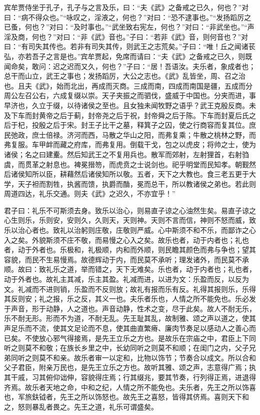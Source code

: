 \documentclass[]{article}
\begin{document}
宾牟贾侍坐于孔子，孔子与之言及乐，曰：``夫《武》之备戒之已久，何也？''对曰：``病不得众也。''``咏叹之，淫液之，何也？''对曰：``恐不逮事也。''``发扬蹈厉之已蚤，何也？''对曰：``及时事也。''``武坐致右宪左，何也？''对曰：``非武坐也。''``声淫及商，何也？''对曰：``非《武》音也。''子曰：``若非《武》音，则何音也？''对曰：``有司失其传也。若非有司失其传，则武王之志荒矣。''子曰：``唯！丘之闻诸苌弘，亦若吾子之言是也。''宾牟贾起，免席而请曰：``夫《武》之备戒之已久，则既闻命矣，敢问：迟之迟而又久，何也？''子曰：``居！吾语汝。夫乐者，象成者也；总干而山立，武王之事也；发扬蹈厉，大公之志也。《武》乱皆坐，周、召之治也。且夫《武》，始而北出，再成而灭商。三成而南，四成而南国是疆，五成而分周公左召公右，六成复缀以崇。天子夹振之而驷伐，盛威于中国也。分夹而进，事早济也，久立于缀，以待诸侯之至也。且女独未闻牧野之语乎？武王克殷反商。未及下车而封黄帝之后于蓟，封帝尧之后于祝，封帝舜之后于陈。下车而封夏后氏之后于杞，投殷之后于宋。封王子比干之墓，释箕子之囚，使之行商容而复其位。庶民弛政，庶士倍禄。济河而西，马散之华山之阳，而弗复乘；牛散之桃林之野，而弗复服。车甲衅而藏之府库，而弗复用。倒载干戈，包之以虎皮；将帅之士，使为诸侯；名之曰建櫜。然后知武王之不复用兵也。散军而郊射，左射狸首，右射驺虞，而贯革之射息也。裨冕搢笏，而虎贲之士说剑也。祀乎明堂而民知孝。朝觐然后诸侯知所以臣，耕藉然后诸侯知所以敬。五者，天下之大教也。食三老五更于大学，天子袒而割牲，执酱而馈，执爵而酳，冕而总干，所以教诸侯之弟也。若此则周道四达，礼乐交通。则夫《武》之迟久，不亦宜乎！''

君子曰：礼乐不可斯须去身。致乐以治心，则易直子谅之心油然生矣。易直子谅之心生则乐，乐则安，安则久，久则天，天则神。天则不言而信，神则不怒而威，致乐以治心者也。致礼以治躬则庄敬，庄敬则严威。心中斯须不和不乐，而鄙诈之心入之矣。外貌斯须不庄不敬，而易慢之心入之矣。故乐也者，动于内者也；礼也者，动于外者也。乐极和，礼极顺，内和而外顺，则民瞻其颜色而弗与争也；望其容貌，而民不生易慢焉。故德辉动于内，而民莫不承听；理发诸外，而民莫不承顺。故曰：致礼乐之道，举而错之，天下无难矣。乐也者，动于内者也；礼也者，动于外者也。故礼主其减，乐主其盈。礼减而进，以进为文：乐盈而反，以反为文。礼减而不进则销，乐盈而不反则放；故礼有报而乐有反。礼得其报则乐，乐得其反则安；礼之报，乐之反，其义一也。夫乐者乐也，人情之所不能免也。乐必发于声音，形于动静，人之道也。声音动静，性术之变，尽于此矣。故人不耐无乐，乐不耐无形。形而不为道，不耐无乱。先王耻其乱，故制雅、颂之声以道之，使其声足乐而不流，使其文足论而不息，使其曲直繁瘠、廉肉节奏足以感动人之善心而已矣。不使放心邪气得接焉，是先王立乐之方也。是故乐在宗庙之中，君臣上下同听之则莫不和敬；在族长乡里之中，长幼同听之则莫不和顺；在闺门之内，父子兄弟同听之则莫不和亲。故乐者审一以定和，比物以饰节；节奏合以成文。所以合和父子君臣，附亲万民也，是先王立乐之方也。故听其雅、颂之声，志意得广焉；执其干戚，习其俯仰诎伸，容貌得庄焉；行其缀兆，要其节奏，行列得正焉，进退得齐焉。故乐者天地之命，中和之纪，人情之所不能免也。夫乐者，先王之所以饰喜也，军旅鈇钺者，先王之所以饰怒也。故先王之喜怒，皆得其侪焉。喜则天下和之，怒则暴乱者畏之。先王之道，礼乐可谓盛矣。
\end{document}
